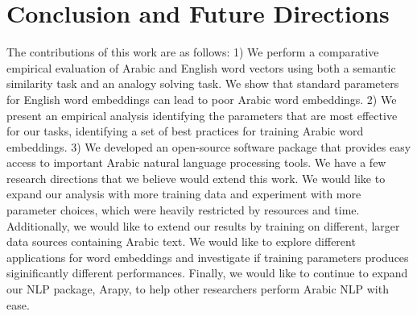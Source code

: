 \section{Conclusion and Future Directions}
\label{sec:conclusion}

The contributions of this work are as follows: 1) We perform a comparative empirical evaluation of Arabic and English word vectors using both a semantic similarity task and an analogy solving task. We show that standard parameters for English word embeddings can lead to poor Arabic word embeddings. 2) We present an empirical analysis identifying the parameters that are most effective for our tasks, identifying a set of best practices for training Arabic word embeddings. 3) We developed an open-source software package that provides easy access to important Arabic natural language processing tools. 
We have a few research directions that we believe would extend this work. We would like to expand our analysis with more training data and experiment with more parameter choices, which were heavily restricted by resources and time. Additionally, we would like to extend our results by training on different, larger data sources containing Arabic text. We would like to explore different applications for word embeddings and investigate if training parameters produces siginificantly different performances. Finally, we would like to continue to expand our NLP package, Arapy, to help other researchers perform Arabic NLP with ease.